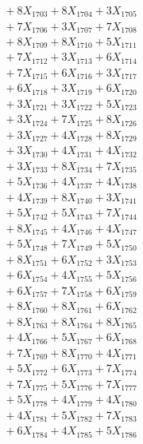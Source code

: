 \documentclass[a4paper,10pt]{article}
\begin{document}
{\begin{align}
&\;  + 8 X_{1703} + 8 X_{1704} + 3 X_{1705} \\[0.3ex]
&\;  + 7 X_{1706} + 3 X_{1707} + 7 X_{1708} \\[0.3ex]
&\;  + 8 X_{1709} + 8 X_{1710} + 5 X_{1711} \\[0.3ex]
&\;  + 7 X_{1712} + 3 X_{1713} + 6 X_{1714} \\[0.3ex]
&\;  + 7 X_{1715} + 6 X_{1716} + 3 X_{1717} \\[0.3ex]
&\;  + 6 X_{1718} + 3 X_{1719} + 6 X_{1720} \\[0.5ex]\allowbreak
&\;  + 3 X_{1721} + 3 X_{1722} + 5 X_{1723} \\[0.3ex]
&\;  + 3 X_{1724} + 7 X_{1725} + 8 X_{1726} \\[0.3ex]
&\;  + 3 X_{1727} + 4 X_{1728} + 8 X_{1729} \\[0.3ex]
&\;  + 3 X_{1730} + 4 X_{1731} + 4 X_{1732} \\[0.3ex]
&\;  + 3 X_{1733} + 8 X_{1734} + 7 X_{1735} \\[0.3ex]
&\;  + 5 X_{1736} + 4 X_{1737} + 4 X_{1738} \\[0.3ex]
&\;  + 4 X_{1739} + 8 X_{1740} + 3 X_{1741} \\[0.3ex]
&\;  + 5 X_{1742} + 5 X_{1743} + 7 X_{1744} \\[0.3ex]
&\;  + 8 X_{1745} + 4 X_{1746} + 4 X_{1747} \\[0.3ex]
&\;  + 5 X_{1748} + 7 X_{1749} + 5 X_{1750} \\[0.5ex]\allowbreak
&\;  + 8 X_{1751} + 6 X_{1752} + 3 X_{1753} \\[0.3ex]
&\;  + 6 X_{1754} + 4 X_{1755} + 5 X_{1756} \\[0.3ex]
&\;  + 6 X_{1757} + 7 X_{1758} + 6 X_{1759} \\[0.3ex]
&\;  + 8 X_{1760} + 8 X_{1761} + 6 X_{1762} \\[0.3ex]
&\;  + 8 X_{1763} + 8 X_{1764} + 8 X_{1765} \\[0.3ex]
&\;  + 4 X_{1766} + 5 X_{1767} + 6 X_{1768} \\[0.3ex]
&\;  + 7 X_{1769} + 8 X_{1770} + 4 X_{1771} \\[0.3ex]
&\;  + 5 X_{1772} + 6 X_{1773} + 7 X_{1774} \\[0.3ex]
&\;  + 7 X_{1775} + 5 X_{1776} + 7 X_{1777} \\[0.3ex]
&\;  + 5 X_{1778} + 4 X_{1779} + 4 X_{1780} \\[0.5ex]\allowbreak
&\;  + 4 X_{1781} + 5 X_{1782} + 7 X_{1783} \\[0.3ex]
&\;  + 6 X_{1784} + 4 X_{1785} + 5 X_{1786} \\[0.3ex]

\end{align}}
\end{document}
